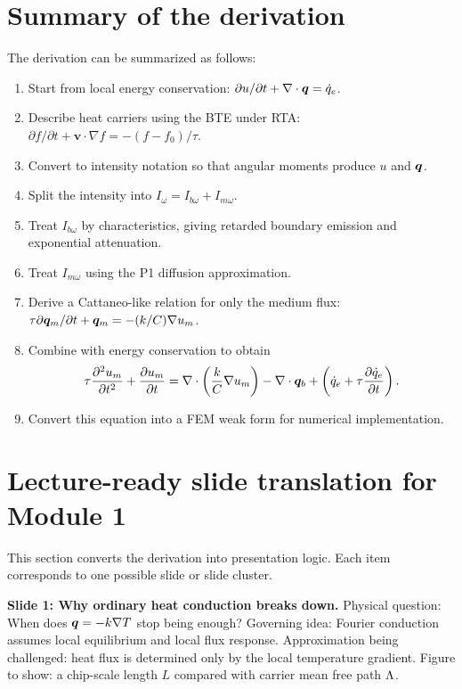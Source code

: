 \documentclass[11pt]{article}
\begin{document}
\section{Summary of the derivation}
The derivation can be summarized as follows:
\begin{enumerate}[leftmargin=1.6em]
    \item Start from local energy conservation: \(\partial u/\partial t+\nabla\cdot\bm{q}=\dot{q}_e\).
    \item Describe heat carriers using the BTE under RTA: \(\partial f/\partial t+\bm{v}\cdot\nabla f=-(f-f_0)/\tau\).
    \item Convert to intensity notation so that angular moments produce \(u\) and \(\bm{q}\).
    \item Split the intensity into \(I_\omega=I_{b\omega}+I_{m\omega}\).
    \item Treat \(I_{b\omega}\) by characteristics, giving retarded boundary emission and exponential attenuation.
    \item Treat \(I_{m\omega}\) using the P1 diffusion approximation.
    \item Derive a Cattaneo-like relation for only the medium flux: \(\tau\partial\bm{q}_m/\partial t+\bm{q}_m=-(k/C)\nabla u_m\).
    \item Combine with energy conservation to obtain
    \begin{equation*}
    \tau\frac{\partial^2u_m}{\partial t^2}+\frac{\partial u_m}{\partial t}
    =\nabla\cdot\left(\frac{k}{C}\nabla u_m\right)-\nabla\cdot\bm{q}_b
    +\left(\dot{q}_e+\tau\frac{\partial\dot{q}_e}{\partial t}\right).
    \end{equation*}
    \item Convert this equation into a FEM weak form for numerical implementation.
\end{enumerate}


\section{Lecture-ready slide translation for Module 1}
This section converts the derivation into presentation logic. Each item corresponds to one possible slide or slide cluster.

\begin{notebox}
\textbf{Slide 1: Why ordinary heat conduction breaks down.}
Physical question: When does \(\bm{q}=-k\nabla T\) stop being enough? Governing idea: Fourier conduction assumes local equilibrium and local flux response. Approximation being challenged: heat flux is determined only by the local temperature gradient. Figure to show: a chip-scale length \(L\) compared with carrier mean free path \(\Lambda\).
\end{notebox}
\end{document}
